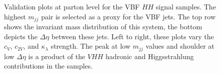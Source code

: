 \begin{figure}[htbp]
    \caption[Validation plots at parton level for the VBF \hh signal samples]{Validation plots at parton level for the VBF $HH$ signal samples. The highest $m_{jj}$ pair is selected as a proxy for the VBF jets. The top row shows the invariant mass distribution of this system, the bottom depicts the $\Delta \eta$ between these jets. Left to right, these plots vary the $c_V$, $c_{2V}$, and $\kappa_\lambda$ strength. The peak at low $m_{jj}$ values and shoulder at low $\Delta \eta$ is a product of the $VHH$ hadronic and Higgsstrahlung contributions in the samples.}
    \label{fig:vbf-mc-validation}
\end{figure}